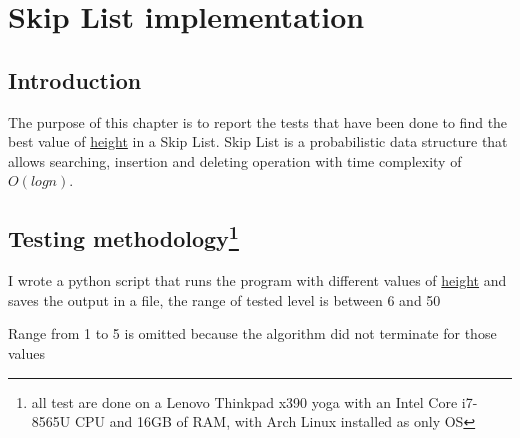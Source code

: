 \section{Skip List implementation}
\subsection{Introduction}
The purpose of this chapter is to report the tests that have been done to find the best value of \underline{height} in a Skip List.
Skip List is a probabilistic data structure that allows searching, insertion and deleting operation with time complexity of $O(log n)$.

\subsection{Testing methodology\footnote{all test are done on a Lenovo Thinkpad x390 yoga with an Intel Core i7-8565U CPU and 16GB of RAM, with Arch Linux installed as only OS}}
I wrote a python script that runs the program with different values of \underline{height} and saves the output in a file, the range of tested level is between 6 and 50
\newline
{}
\newline
Range from 1 to 5 is omitted because the algorithm did not terminate for those values